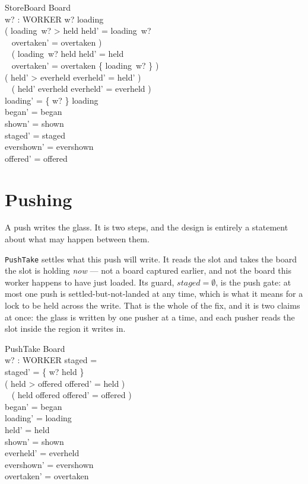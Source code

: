 \documentclass[a4paper,10pt,fleqn]{article}
\begin{document}
\begin{schema}{StoreBoard}
  \Delta Board \\
  w? : WORKER
\where
  w? \in \dom loading \\
  ( loading~w? > held \land held' = loading~w? \\
  \quad~ \land overtaken' = overtaken ) \lor \\
  \quad~ ( loading~w? \leq held \land held' = held \\
  \quad~ \land overtaken' = overtaken \cup \{ loading~w? \} ) \\
  ( held' > everheld \land everheld' = held' ) \lor \\
  \quad~ ( held' \leq everheld \land everheld' = everheld ) \\
  loading' = \{ w? \} \ndres loading \\
  began' = began \\
  shown' = shown \\
  staged' = staged \\
  evershown' = evershown \\
  offered' = offered
\end{schema}

\section{Pushing}
\label{sec:push}

A push writes the glass. It is two steps, and the design is entirely a
statement about what may happen between them.

\texttt{PushTake} settles what this push will write. It reads the slot and takes
the board the slot is holding \emph{now} --- not a board captured earlier, and
not the board this worker happens to have just loaded. Its guard, $staged =
\emptyset$, is the push gate: at most one push is settled-but-not-landed at any
time, which is what it means for a lock to be held across the write. That is the
whole of the fix, and it is two claims at once: the glass is written by one
pusher at a time, and each pusher reads the slot inside the region it writes in.

\begin{schema}{PushTake}
  \Delta Board \\
  w? : WORKER
\where
  staged = \emptyset \\
  staged' = \{ w? \mapsto held \} \\
  ( held > offered \land offered' = held ) \lor \\
  \quad~ ( held \leq offered \land offered' = offered ) \\
  began' = began \\
  loading' = loading \\
  held' = held \\
  shown' = shown \\
  everheld' = everheld \\
  evershown' = evershown \\
  overtaken' = overtaken
\end{schema}
\end{document}
